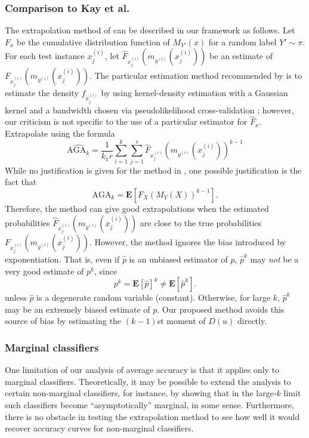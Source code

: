 \documentclass[twoside,11pt]{article}
\newcommand{\E}{\textbf{E}}
\begin{document}
\subsubsection*{Comparison to Kay et al.}
The extrapolation method of \cite{Kay2008a} can be described in our
framework as follows.  Let $F_x$ be the cumulative distribution
function of $M_{Y'}(x)$ for a random label $Y' \sim \pi$.  For each
test instance $x^{(i)}_j$, let
$\hat{F}_{x^{(i)}_j}(m_{y^{(i)}}(x^{(i)}_j))$ be an estimate of
$F_{x^{(i)}_j}(m_{y^{(i)}}(x^{(i)}_j))$.  The particular estimation
method recommended by \cite{Kay2008a} is to estimate the density
$f_{x^{(i)}_j}$ by using kernel-density estimation with a Gaussian
kernel and a bandwidth chosen via pseudolikelihood cross-validation
\citep{cao1994comparative}; however, our criticism is not specific to
the use of a particular estimator for $\hat{F}_x$.  Extrapolate using
the formula
\[
\widehat{\text{AGA}_k} = \frac{1}{k_1 r} \sum_{i=1}^k \sum_{j=1}^r \hat{F}_{x^{(i)}_j}(m_{y^{(i)}}(x^{(i)}_j))^{k-1}
\]
While no justification is given for the method in \cite{Kay2008a},  one possible justification is the fact that
\[\text{AGA}_k = \E[F_X(M_{Y}(X))^{k-1}].\]
Therefore, the method can give good extrapolations when the estimated
probabilities $\hat{F}_{x^{(i)}_j}(m_{y^{(i)}}(x^{(i)}_j))$ are close
to the true probabilities $F_{x^{(i)}_j}(m_{y^{(i)}}(x^{(i)}_j))$.
However, the method ignores the bias introduced by exponentiation.
That is, even if $\hat{p}$ is an unbiased estimator of $p$, $\hat{p}^k$ may \emph{not} be a very good estimate of $p^k$, since
\[
p^k = \E[\hat{p}]^k \neq \E[\hat{p}^k].
\]
unless $\hat{p}$ is a degenerate random variable
(constant). Otherwise, for large $k$, $\hat{p}^k$ may be an extremely
biased estimate of $p$.  Our proposed method avoids this source of
bias by estimating the $(k-1)$st moment of $D(u)$ directly.

\subsubsection*{Marginal classifiers}
One limitation of our analysis of average accuracy is that it applies
only to marginal classifiers.  Theoretically, it may be possible to
extend the analysis to certain non-marginal classifiers, for instance,
by showing that in the large-$k$ limit such classifiers become
``asymptotically'' marginal, in some sense. Furthermore,  
there is no obstacle in testing the extrapolation method to
see how well it would recover accuracy curves for non-marginal classifiers. 
\end{document}

